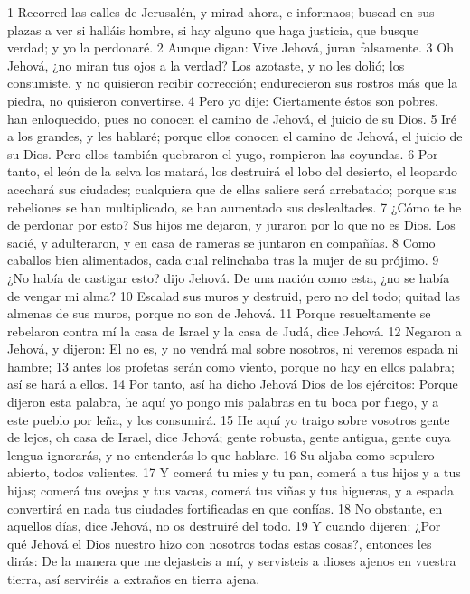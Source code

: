 1 Recorred las calles de Jerusalén, y mirad ahora, e informaos; buscad en sus plazas a ver si halláis hombre, si hay alguno que haga justicia, que busque verdad; y yo la perdonaré.
2 Aunque digan: Vive Jehová, juran falsamente.
3 Oh Jehová, ¿no miran tus ojos a la verdad? Los azotaste, y no les dolió; los consumiste, y no quisieron recibir corrección; endurecieron sus rostros más que la piedra, no quisieron convertirse.
4 Pero yo dije: Ciertamente éstos son pobres, han enloquecido, pues no conocen el camino de Jehová, el juicio de su Dios.
5 Iré a los grandes, y les hablaré; porque ellos conocen el camino de Jehová, el juicio de su Dios. Pero ellos también quebraron el yugo, rompieron las coyundas.
6 Por tanto, el león de la selva los matará, los destruirá el lobo del desierto, el leopardo acechará sus ciudades; cualquiera que de ellas saliere será arrebatado; porque sus rebeliones se han multiplicado, se han aumentado sus deslealtades.
7 ¿Cómo te he de perdonar por esto? Sus hijos me dejaron, y juraron por lo que no es Dios. Los sacié, y adulteraron, y en casa de rameras se juntaron en compañías.
8 Como caballos bien alimentados, cada cual relinchaba tras la mujer de su prójimo.
9 ¿No había de castigar esto? dijo Jehová. De una nación como esta, ¿no se había de vengar mi alma?
10 Escalad sus muros y destruid, pero no del todo; quitad las almenas de sus muros, porque no son de Jehová.
11 Porque resueltamente se rebelaron contra mí la casa de Israel y la casa de Judá, dice Jehová.
12 Negaron a Jehová, y dijeron: El no es, y no vendrá mal sobre nosotros, ni veremos espada ni hambre;
13 antes los profetas serán como viento, porque no hay en ellos palabra; así se hará a ellos.
14 Por tanto, así ha dicho Jehová Dios de los ejércitos: Porque dijeron esta palabra, he aquí yo pongo mis palabras en tu boca por fuego, y a este pueblo por leña, y los consumirá.
15 He aquí yo traigo sobre vosotros gente de lejos, oh casa de Israel, dice Jehová; gente robusta, gente antigua, gente cuya lengua ignorarás, y no entenderás lo que hablare.
16 Su aljaba como sepulcro abierto, todos valientes.
17 Y comerá tu mies y tu pan, comerá a tus hijos y a tus hijas; comerá tus ovejas y tus vacas, comerá tus viñas y tus higueras, y a espada convertirá en nada tus ciudades fortificadas en que confías.
18 No obstante, en aquellos días, dice Jehová, no os destruiré del todo.
19 Y cuando dijeren: ¿Por qué Jehová el Dios nuestro hizo con nosotros todas estas cosas?, entonces les dirás: De la manera que me dejasteis a mí, y servisteis a dioses ajenos en vuestra tierra, así serviréis a extraños en tierra ajena.
